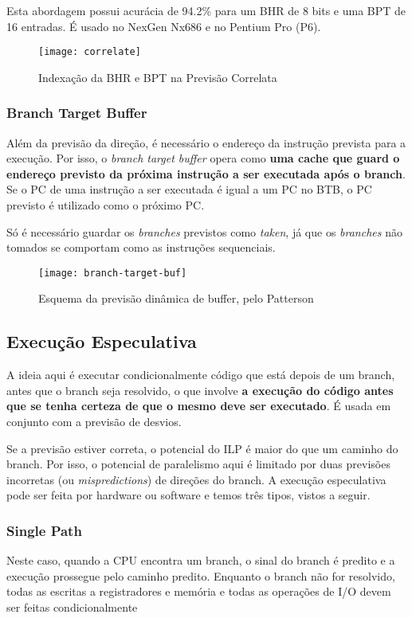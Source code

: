 Esta abordagem possui acurácia de 94.2\% para um BHR de 8 bits e uma BPT de 16 entradas. É usado no NexGen Nx686 e no Pentium Pro (P6).

\begin{figure}[ht]
  \centering
  \texttt{[image: correlate]}
  \caption{Indexação da BHR e BPT na Previsão Correlata}
  \label{fig:correlate}
\end{figure}



\subsubsection{Branch Target Buffer}
Além da previsão da direção, é necessário o endereço da instrução prevista para a execução. Por isso, o \textit{branch target buffer} opera como \textbf{uma cache que guard o endereço previsto da próxima instrução a ser executada após o branch}. Se o PC de uma instrução a ser executada é igual a um PC no BTB, o PC previsto é utilizado como o próximo PC.

Só é necessário guardar os \textit{branches} previstos como \textit{taken}, já que os \textit{branches} não tomados se comportam como as instruções sequenciais.

\begin{figure}[ht]
  \centering
  \texttt{[image: branch-target-buf]}
  \caption{Esquema da previsão dinâmica de buffer, pelo Patterson}
  \label{fig:branch-target-buf}
\end{figure}



\subsection{Execução Especulativa}
A ideia aqui é executar condicionalmente código que está depois de um branch, antes que o branch seja resolvido, o que involve \textbf{a execução do código antes que se tenha certeza de que o mesmo deve ser executado}. É usada em conjunto com a previsão de desvios.

Se a previsão estiver correta, o potencial do ILP é maior do que um caminho do branch. Por isso, o potencial de paralelismo aqui é limitado por duas previsões incorretas (ou \textit{mispredictions}) de direções do branch. A execução especulativa pode ser feita por hardware ou software e temos três tipos, vistos a seguir.



\subsubsection{Single Path}
Neste caso, quando a CPU encontra um branch, o sinal do branch é predito e a
execução prossegue pelo caminho predito. Enquanto o branch não for resolvido, todas as escritas a registradores e memória e todas as operações de I/O devem ser feitas condicionalmente

